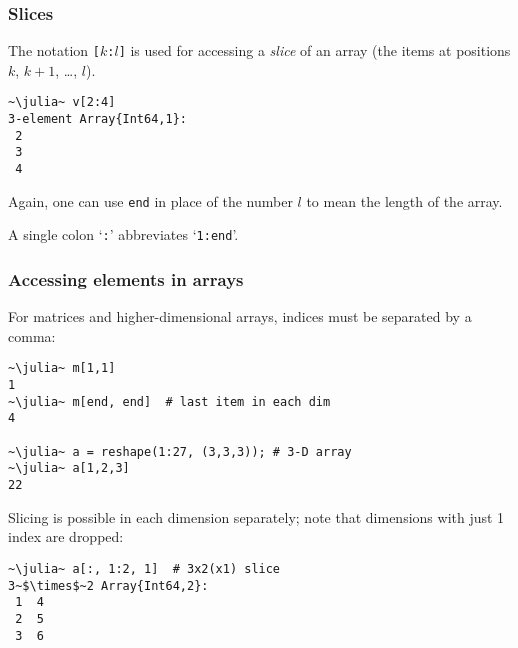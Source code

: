 \documentclass[english,serif,mathserif,xcolor=pdftex,dvipsnames,table]{beamer}
\begin{document}
\begin{frame}[fragile]
  \frametitle{Slices}
  The notation \texttt{[$k$:$l$]} is used for accessing a \emph{slice}
  of an array (the items at positions $k$, $k+1$, \ldots, $l$).
\begin{lstlisting}
~\julia~ v[2:4]
3-element Array{Int64,1}:
 2
 3
 4
\end{lstlisting}

  \+ Again, one can use \texttt{end} in place of the number $l$ to
  mean the length of the array.

  \+ A single colon `\texttt{:}' abbreviates `\texttt{1:end}'.
\end{frame}


\begin{frame}[fragile]
  \frametitle{Accessing elements in arrays}
  \smaller
  For matrices and higher-dimensional arrays,
  indices must be separated by a comma:
\begin{lstlisting}
~\julia~ m[1,1]
1
~\julia~ m[end, end]  # last item in each dim
4

~\julia~ a = reshape(1:27, (3,3,3)); # 3-D array
~\julia~ a[1,2,3]
22
\end{lstlisting}

  Slicing is possible in each dimension separately;
  note that dimensions with just 1 index are dropped:
\begin{lstlisting}
~\julia~ a[:, 1:2, 1]  # 3x2(x1) slice
3~$\times$~2 Array{Int64,2}:
 1  4
 2  5
 3  6
\end{lstlisting}
\end{frame}
\end{document}
